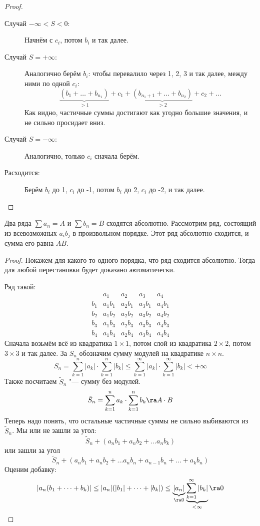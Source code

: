 \begin{proof}
\begin{description}
	\item[Случай $-\infty < S < 0$:]
		Начнём с $c_i$, потом $b_i$ и так далее.

	\item[Случай $S = +\infty$:]
		Аналогично берём $b_i$: чтобы перевалило через 1, 2, 3 и так далее, между ними по одной $c_i$:
		\[ \underbrace{(b_1 + \dots + b_{n_1})}_{> 1} + c_1 + \underbrace{(b_{n_1 + 1} + \dots + b_{n_2})}_{> 2} + c_2 + \dots \]
		Как видно, частичные суммы достигают как угодно большие значения, и не сильно просидает вниз.

	\item[Случай $S = -\infty$:]
		Аналогично, только $c_i$ сначала берём.

	\item[Расходится:]
		Берём $b_i$ до 1, $c_i$ до -1, потом $b_i$ до 2, $c_i$ до -2, и так далее.
	\end{description}
\end{proof}

\begin{theorem}[Коши]
	Два ряда $\sum a_n = A$ и $\sum b_n = B$ сходятся абсолютно.
	Рассмотрим ряд, состоящий из всевозможных $a_ib_j$ в произвольном порядке.
	Этот ряд абсолютно сходится, и сумма его равна $AB$.
\end{theorem}
\begin{proof}
	Покажем для какого-то одного порядка, что ряд сходится абсолютно.
	Тогда для любой перестановки будет доказано автоматически.

	Ряд такой:
	\[\begin{array}{ccccc}
		    & a_1    & a_2    & a_3    & a_4    \\
		b_1 & a_1b_1 & a_2b_1 & a_3b_1 & a_4b_1 \\
		b_2 & a_1b_2 & a_2b_2 & a_3b_2 & a_4b_2 \\
		b_3 & a_1b_3 & a_2b_3 & a_3b_3 & a_4b_3 \\
		b_4 & a_1b_4 & a_2b_4 & a_3b_4 & a_4b_4
	\end{array}\]
	Сначала возьмём всё из квадратика $1 \times 1$, потом слой из квадратика $2 \times 2$, потом $3 \times 3$ и так далее.
	За $S_n$ обозначим сумму модулей на квадратике $n \times n$.
	\[ S_n = \sum_{k=1}^n |a_k| \cdot \sum_{k=1}^n |b_k| \le \sum_{k=1}^\infty |a_k| \cdot \sum_{k=1}^\infty |b_k| < +\infty \]
	Также посчитаем $\tilde S_n$ "--- сумму без модулей.
	\[ \tilde S_n = \sum_{k=1}^n a_k \cdot \sum_{k=1}^n b_k \ra A \cdot B \]
	Теперь надо понять, что остальные частичные суммы не сильно выбиваются из $\tilde S_n$.
	Мы или не зашли за угол:
	\[ \tilde S_n + (a_nb_1 + a_nb_2 + \dots a_nb_k) \]
	или зашли за угол
	\[ \tilde S_n + (a_nb_1 + a_nb_2 + \dots a_nb_n + a_{n-1}b_n + \dots + a_kb_n) \]
	Оценим добавку:
	\[
		|a_n(b_1 + \dots + b_k)| 
		\le |a_n| (|b_1| + \dots + |b_k|)
		\le \underbrace{|a_n|}_{\ra 0} \underbrace{\sum_{k=1}^\infty |b_k|}_{<\infty} \ra 0
	\]
\end{proof}

